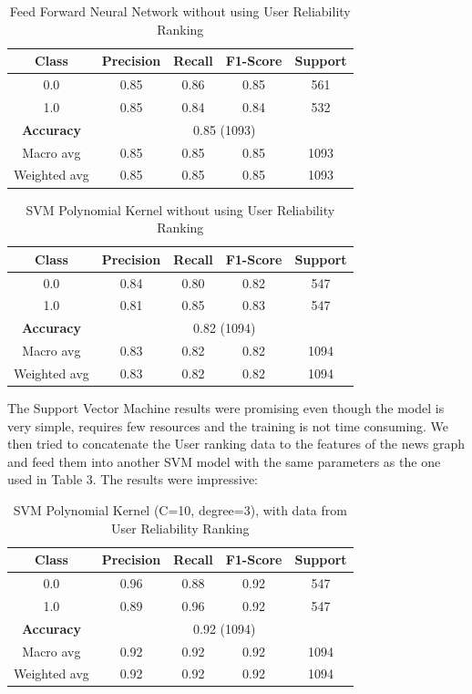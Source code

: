 \documentclass[11pt,a4paper]{article}
\begin{document}
\begin{table}[ht]
\centering
\begin{tabular}{|c|c|c|c|c|}
\hline
Class & Precision & Recall & F1-Score & Support \\
\hline
0.0    & 0.85      & 0.86   & 0.85     & 561     \\
1.0    & 0.85      & 0.84   & 0.84     & 532     \\
\hline
\textbf{Accuracy}   & \multicolumn{4}{c|}{0.85 (1093)} \\
\hline
Macro avg           & 0.85      & 0.85   & 0.85     & 1093    \\
Weighted avg        & 0.85      & 0.85   & 0.85     & 1093    \\
\hline
\end{tabular}
\caption{Feed Forward Neural Network without using User Reliability Ranking}
\end{table}


\begin{table}[ht]
\centering
\begin{tabular}{|c|c|c|c|c|}
\hline
Class & Precision & Recall & F1-Score & Support \\
\hline
0.0    & 0.84      & 0.80   & 0.82     & 547     \\
1.0    & 0.81      & 0.85   & 0.83     & 547     \\
\hline
\textbf{Accuracy}   & \multicolumn{4}{c|}{0.82 (1094)} \\
\hline
Macro avg           & 0.83      & 0.82   & 0.82     & 1094    \\
Weighted avg        & 0.83      & 0.82   & 0.82     & 1094    \\
\hline
\end{tabular}
\caption{SVM Polynomial Kernel without using User Reliability Ranking}
\end{table}

\newpage

The Support Vector Machine results were promising even though the model is very simple, requires few resources and the training is not time consuming. We then tried to concatenate the User ranking data to the features of the news graph and feed them into another SVM model with the same parameters as the one used in Table 3. The results were impressive:

\begin{table}[ht]
\centering
\begin{tabular}{|c|c|c|c|c|}
\hline
Class & Precision & Recall & F1-Score & Support \\
\hline
0.0    & 0.96      & 0.88   & 0.92     & 547     \\
1.0    & 0.89      & 0.96   & 0.92     & 547     \\
\hline
\textbf{Accuracy}   & \multicolumn{4}{c|}{0.92 (1094)} \\
\hline
Macro avg           & 0.92      & 0.92   & 0.92     & 1094    \\
Weighted avg        & 0.92      & 0.92   & 0.92     & 1094    \\
\hline
\end{tabular}
\caption{SVM Polynomial Kernel (C=10, degree=3), with data from User Reliability Ranking}
\end{table}
\end{document}
